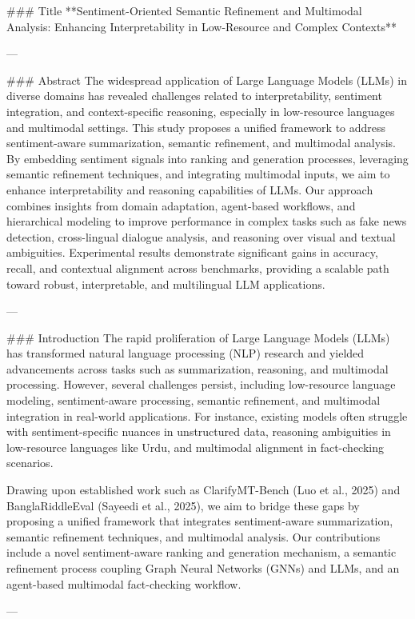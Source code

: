 ### Title
**Sentiment-Oriented Semantic Refinement and Multimodal Analysis: Enhancing Interpretability in Low-Resource and Complex Contexts**

---

### Abstract
The widespread application of Large Language Models (LLMs) in diverse domains has revealed challenges related to interpretability, sentiment integration, and context-specific reasoning, especially in low-resource languages and multimodal settings. This study proposes a unified framework to address sentiment-aware summarization, semantic refinement, and multimodal analysis. By embedding sentiment signals into ranking and generation processes, leveraging semantic refinement techniques, and integrating multimodal inputs, we aim to enhance interpretability and reasoning capabilities of LLMs. Our approach combines insights from domain adaptation, agent-based workflows, and hierarchical modeling to improve performance in complex tasks such as fake news detection, cross-lingual dialogue analysis, and reasoning over visual and textual ambiguities. Experimental results demonstrate significant gains in accuracy, recall, and contextual alignment across benchmarks, providing a scalable path toward robust, interpretable, and multilingual LLM applications. 

---

### Introduction
The rapid proliferation of Large Language Models (LLMs) has transformed natural language processing (NLP) research and yielded advancements across tasks such as summarization, reasoning, and multimodal processing. However, several challenges persist, including low-resource language modeling, sentiment-aware processing, semantic refinement, and multimodal integration in real-world applications. For instance, existing models often struggle with sentiment-specific nuances in unstructured data, reasoning ambiguities in low-resource languages like Urdu, and multimodal alignment in fact-checking scenarios. 

Drawing upon established work such as ClarifyMT-Bench (Luo et al., 2025) and BanglaRiddleEval (Sayeedi et al., 2025), we aim to bridge these gaps by proposing a unified framework that integrates sentiment-aware summarization, semantic refinement techniques, and multimodal analysis. Our contributions include a novel sentiment-aware ranking and generation mechanism, a semantic refinement process coupling Graph Neural Networks (GNNs) and LLMs, and an agent-based multimodal fact-checking workflow.

---

